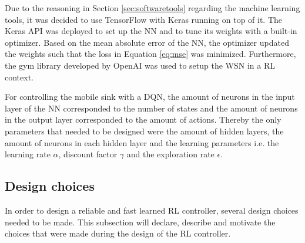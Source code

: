 \noindent Due to the reasoning in Section \ref{sec:softwaretools} regarding the machine learning tools, it was decided to use TensorFlow with Keras running on top of it. The Keras API was deployed to set up the NN and to tune its weights with a built-in optimizer. Based on the mean absolute error of the NN, the optimizer updated the weights such that the loss in Equation \ref{eq:mse} was minimized. Furthermore, the gym library developed by OpenAI was used to setup the WSN in a RL context. \newline

\noindent For controlling the mobile sink with a DQN, the amount of neurons in the input layer of the NN corresponded to the number of states and the amount of neurons in the output layer corresponded to the amount of actions. Thereby the only parameters that needed to be designed were the amount of hidden layers, the amount of neurons in each hidden layer and the learning parameters i.e. the learning rate $\alpha$, discount factor $\gamma$ and the exploration rate $\epsilon$.


\subsection{Design choices}
\label{sec:RLdesignchoices}
In order to design a reliable and fast learned RL controller, several design choices needed to be made. This subsection will declare, describe and motivate the choices that were made during the design of the RL controller.  

